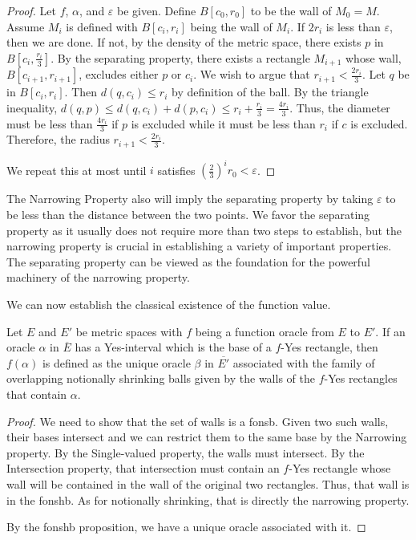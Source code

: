 \documentclass[12pt]{article}
\begin{document}
\begin{proof}
    Let $f$, $\alpha$, and $\varepsilon$ be given. Define $B[c_0, r_0]$ to be the wall of $M_0 =M $. Assume $M_i$ is defined with $B[c_i, r_i]$ being the wall of $M_i$. If $2r_i$ is less than $\varepsilon$, then we are done. If not, by the density of the metric space, there exists $p$ in $B[c_i, \frac{r_i}{3}]$. By the separating property, there exists a rectangle $M_{i+1}$ whose wall, $B[c_{i+1}, r_{i+1}]$, excludes either $ p$ or $c_i$. We wish to argue that $r_{i+1} < \frac{2r_i}{3}$. Let $q$ be in $B[c_i, r_i]$. Then $d(q, c_i) \leq r_i$ by definition of the ball.  By the triangle inequality, $d(q, p) \leq d(q,c_i) + d(p, c_i) \leq r_i + \frac{r_i}{3}= \frac{4 r_i}{3}$. Thus, the diameter must be less than $\frac{4r_i}{3}$ if $p$ is excluded while it must be less than $r_i$ if $c$ is excluded. Therefore, the radius $r_{i+1} < \frac{2r_i}{3}$. 

    We repeat this at most until $i$ satisfies $(\frac{2}{3})^i r_0 < \varepsilon$. 
\end{proof}

The Narrowing Property also will imply the separating property by taking $\varepsilon$ to be less than the distance between the two points. We favor the separating property as it usually does not require more than two steps to establish, but the narrowing property is crucial in establishing a variety of important properties. The separating property can be viewed as the foundation for the powerful machinery of the narrowing property. 

We can now establish the classical existence of the function value.

\begin{proposition}
Let $E$ and $E'$ be metric spaces with $f$ being a function oracle from $E$ to $E'$. If an oracle $\alpha$ in $\overline{E}$ has a Yes-interval which is the base of a $f$-Yes rectangle, then $f(\alpha)$ is defined as the unique oracle $\beta$ in $\overline{E'}$ associated with the family of overlapping notionally shrinking balls given by the walls of the $f$-Yes rectangles that contain $\alpha$. 
\end{proposition}

\begin{proof}
We need to show that the set of walls is a fonsb. Given two such walls, their bases intersect and we can restrict them to the same base by the Narrowing property. By the Single-valued property, the walls must intersect. By the Intersection property, that intersection must contain an $f$-Yes rectangle whose wall will be contained in the wall of the original two rectangles. Thus, that wall is in the fonshb. As for notionally shrinking, that is directly the narrowing property. 

By the fonshb proposition, we have a unique oracle associated with it. 
\end{proof}
\end{document}
